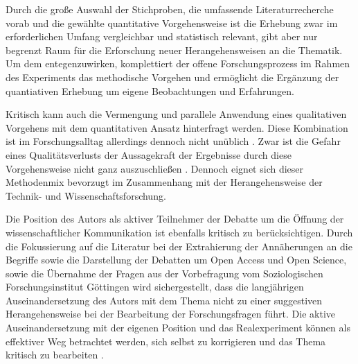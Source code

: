 Durch die große Auswahl der Stichproben, die umfassende Literaturrecherche vorab und die gewählte quantitative Vorgehensweise ist die Erhebung zwar im erforderlichen Umfang vergleichbar und statistisch relevant, gibt aber nur begrenzt Raum für die Erforschung neuer Herangehensweisen an die Thematik. Um dem entegenzuwirken, komplettiert der offene Forschungsprozess im Rahmen des Experiments das methodische Vorgehen und ermöglicht die Ergänzung der quantiativen Erhebung um eigene Beobachtungen und Erfahrungen.

Kritisch kann auch die Vermengung und parallele Anwendung eines qualitativen Vorgehens mit dem quantitativen Ansatz hinterfragt werden. Diese Kombination ist im Forschungsalltag allerdings dennoch nicht unüblich \cite{bortz_Doering_2006_Methoden}. Zwar ist die Gefahr eines Qualitätsverlusts der Aussagekraft der Ergebnisse durch diese Vorgehensweise nicht ganz auszuschließen \cite{suchen_Lamek_1993_S_198}. Dennoch eignet sich dieser Methodenmix bevorzugt im Zusammenhang mit der Herangehensweise der Technik- und Wissenschaftsforschung.

Die Position des Autors als aktiver Teilnehmer der Debatte um die Öffnung der wissenschaftlicher Kommunikation ist ebenfalls kritisch zu berücksichtigen. Durch die Fokussierung auf die Literatur bei der Extrahierung der Annäherungen an die Begriffe sowie die Darstellung der Debatten um Open Access und Open Science, sowie die Übernahme der Fragen aus der Vorbefragung vom Soziologischen Forschungsinstitut Göttingen wird sichergestellt, dass die langjährigen Auseinandersetzung des Autors mit dem Thema nicht zu einer suggestiven Herangehensweise bei der Bearbeitung der Forschungsfragen führt. Die aktive Auseinandersetzung mit der eigenen Position und das Realexperiment können als effektiver Weg betrachtet werden, sich selbst zu korrigieren und das Thema kritisch zu bearbeiten \cite{Krohn_2005}.
